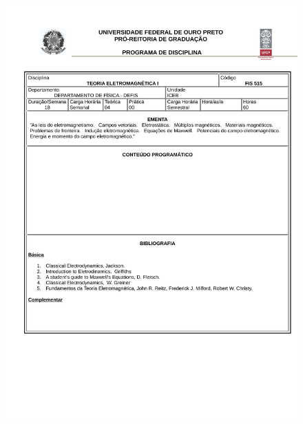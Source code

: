 \begin{figure}[p]
	\centering 
	\includegraphics[scale=0.7]{capitulos/anexo1-programas-disciplina/eg312.pdf}
\end{figure}

